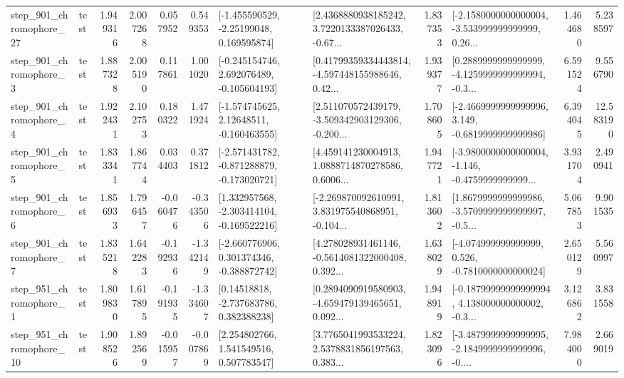 \begin{tabular}{llrrrrllrlrr}
  step\_901\_chromophore\_27 &      test &      1.949316 &    2.007268 &      0.057952 &  0.549353 &    [-1.455590529, -2.25199048, 0.169595874] &  [2.4368880938185242, 3.7220133387026433, -0.67... &       1.837353 &  [-2.1580000000000004, -3.533999999999999, 0.26... &            1.464680 &          5.238597 \\
   step\_901\_chromophore\_3 &      test &      1.887328 &    2.005190 &      0.117861 &  1.001020 &   [-0.245154746, 2.692076489, -0.105604193] &  [0.41799359334443814, -4.597448155988646, 0.42... &       1.939377 &  [0.2889999999999999, -4.1259999999999994, -0.3... &            6.591524 &          9.556790 \\
   step\_901\_chromophore\_4 &      test &      1.922431 &    2.102753 &      0.180322 &  1.471924 &    [-1.574745625, 2.12648511, -0.160463555] &  [2.511070572439179, -3.509342903129306, -0.200... &       1.708605 &  [-2.4669999999999996, 3.149, -0.6819999999999986] &            6.394045 &         12.583190 \\
   step\_901\_chromophore\_5 &      test &      1.833341 &    1.867744 &      0.034403 &  0.371812 &  [-2.571431782, -0.871288879, -0.173020721] &  [4.459141230004913, 1.0888714870278586, 0.6006... &       1.947721 &  [-3.9800000000000004, -1.146, -0.4759999999999... &            3.931704 &          2.490941 \\
   step\_901\_chromophore\_6 &      test &      1.856933 &    1.796457 &     -0.060476 & -0.343506 &   [1.332957568, -2.303414104, -0.169522216] &  [-2.269870092610991, 3.831975540868951, -0.104... &       1.813602 &  [1.8679999999999986, -3.5709999999999997, -0.5... &            5.067853 &          9.901535 \\
   step\_901\_chromophore\_7 &      test &      1.835218 &    1.642283 &     -0.192936 & -1.342149 &   [-2.660776906, 0.301374346, -0.388872742] &  [4.278028931461146, -0.5614081322000408, 0.392... &       1.638029 &   [-4.074999999999999, 0.526, -0.7810000000000024] &            2.650129 &          5.560997 \\
   step\_951\_chromophore\_1 &      test &      1.809830 &    1.617895 &     -0.191935 & -1.334607 &     [0.14518818, -2.737683786, 0.382388238] &  [0.2894090919580903, -4.659479139465651, 0.092... &       1.948919 &  [-0.18799999999999994, 4.138000000000002, -0.3... &            3.126862 &          3.831558 \\
  step\_951\_chromophore\_10 &      test &      1.908526 &    1.892569 &     -0.015957 & -0.007869 &     [2.254802766, 1.541549516, 0.507783547] &  [3.7765041993533224, 2.5378831856197563, 0.383... &       1.823096 &  [-3.4879999999999995, -2.1849999999999996, -0.... &            7.984000 &          2.669019 \\

\end{tabular}
